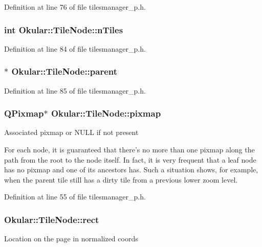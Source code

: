 Definition at line 76 of file tilesmanager\+\_\+p.\+h.

\hypertarget{classOkular_1_1TileNode_ab5af51178fe629bbee781d656671eaf5}{
\subsubsection[{n\+Tiles}]{\setlength{\rightskip}{0pt plus 5cm}int Okular\+::\+Tile\+Node\+::n\+Tiles}}\label{classOkular_1_1TileNode_ab5af51178fe629bbee781d656671eaf5}


Definition at line 84 of file tilesmanager\+\_\+p.\+h.

\hypertarget{classOkular_1_1TileNode_ade947c75baa62dd6d29fe7776f1e6027}{
\subsubsection[{parent}]{$\ast$ Okular\+::\+Tile\+Node\+::parent}}\label{classOkular_1_1TileNode_ade947c75baa62dd6d29fe7776f1e6027}


Definition at line 85 of file tilesmanager\+\_\+p.\+h.

\hypertarget{classOkular_1_1TileNode_a6f1530e7484013655499145b83debc0d}{
\subsubsection[{pixmap}]{\setlength{\rightskip}{0pt plus 5cm}Q\+Pixmap$\ast$ Okular\+::\+Tile\+Node\+::pixmap}}\label{classOkular_1_1TileNode_a6f1530e7484013655499145b83debc0d}
Associated pixmap or N\+U\+L\+L if not present

For each node, it is guaranteed that there's no more than one pixmap along the path from the root to the node itself. In fact, it is very frequent that a leaf node has no pixmap and one of its ancestors has. Such a situation shows, for example, when the parent tile still has a dirty tile from a previous lower zoom level. 

Definition at line 55 of file tilesmanager\+\_\+p.\+h.

\hypertarget{classOkular_1_1TileNode_a4b576ad78dac8c1d5c68fd9961b9c038}{
\subsubsection[{rect}]{ Okular\+::\+Tile\+Node\+::rect}}\label{classOkular_1_1TileNode_a4b576ad78dac8c1d5c68fd9961b9c038}
Location on the page in normalized coords 


